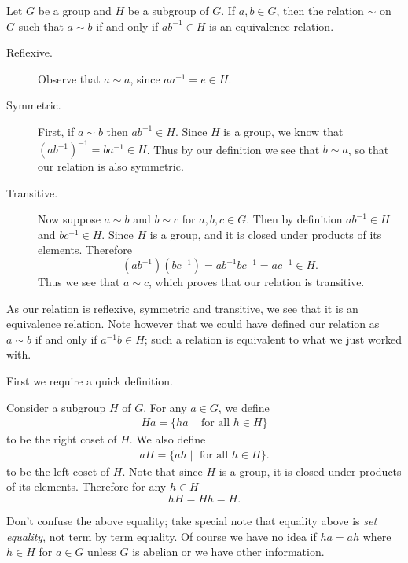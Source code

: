     Let $G$ be a group and $H$ be a subgroup of $G$. If $a, b \in G$, then the
    relation $\sim$ on $G$ such that $a \sim b$ if and only if $ab^{-1} \in H$
    is an equivalence relation.
  \begin{prf}
    \begin{description}
        \item[Reflexive.] Observe that $a \sim a$, since $aa^{-1} = e
        \in H$.

        \item[Symmetric.] First, if $a \sim b$ then $ab^{-1} \in H$. Since $H$ is a
        group, we know that $(ab^{-1})^{-1} = ba^{-1} \in H$.
        Thus by our definition we see that $b \sim a$, so that our
        relation is also symmetric. 

        \item[Transitive.] Now suppose $a \sim b$ and $b \sim c$ for
        $a, b, c \in G$. Then by definition $ab^{-1} \in H$ and
        $bc^{-1} \in H$. Since $H$ is a group, and it is closed under
        products of its elements. Therefore
        \[
            (ab^{-1})(bc^{-1}) = ab^{-1}bc^{-1} = ac^{-1} \in H.
        \]
        Thus we see that $a \sim c$, which proves that our
        relation is transitive.
    \end{description}
\end{prf}
    As our relation is reflexive, symmetric and transitive, we see
    that it is an equivalence relation. Note however that we could
    have defined our relation as $a \sim b$ if and only if $a^{-1}b
    \in H$; such a relation is equivalent to what we just worked with.

    First we require a quick definition.
    \begin{definition}
        Consider a subgroup $H$ of $G$. For any $a \in G$, we define
        \begin{align*}
            Ha = \{ha \mid \text{ for all }h \in H\}
        \end{align*}
        to be the right coset of $H$. We also define
        \begin{align*} 
            aH = \{ah \mid \text{ for all }h \in H\}. 
        \end{align*}
        to be the left coset of $H$.
        Note that since $H$ is a group, it is closed under products of
        its elements. Therefore for any $h\in H$
        \[
            hH = Hh = H.
        \]
    \end{definition}

    \textcolor{red!80}{Don't confuse the above equality; take special note that 
    equality above is \textit{set equality}, not term by term
    equality. Of course we have no idea if $ha = ah$ where $h \in H$
    for $a \in G$ unless $G$ is abelian or we have other information.}
    \\

